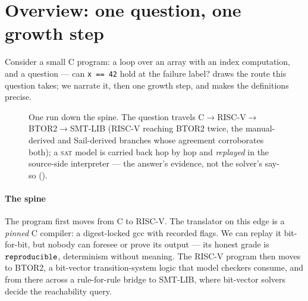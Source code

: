 
\section{Overview: one question, one growth step}
\label{sec:overview}

Consider a small C program: a loop over an array with an index
computation, and a question --- can \texttt{x == 42} hold at the failure
label?  draws the route this question takes; we narrate
it, then one growth step, and  makes the
definitions precise.

\begin{figure}
\centering
{}
\caption{One run down the spine. The question travels
C$\to$RISC-V$\to$BTOR2$\to$SMT-LIB (RISC-V reaching BTOR2 twice, the
manual-derived and Sail-derived branches whose agreement corroborates
both); a \textsc{sat} model is carried back hop by hop and
\emph{replayed} in the source-side interpreter --- the answer's
evidence, not the solver's say-so ().}
\label{fig:run}
\end{figure}

\paragraph{The spine}
The program first moves from C to RISC-V. The translator on this edge is
a \emph{pinned} C compiler: a digest-locked gcc with recorded flags. We
can replay it bit-for-bit, but nobody can foresee or prove its output ---
its honest grade is $\mathtt{reproducible}$, determinism without meaning. The RISC-V
program then moves to BTOR2, a bit-vector transition-system logic that
model checkers consume, and from there across a rule-for-rule bridge to
SMT-LIB, where bit-vector solvers decide the reachability query.

